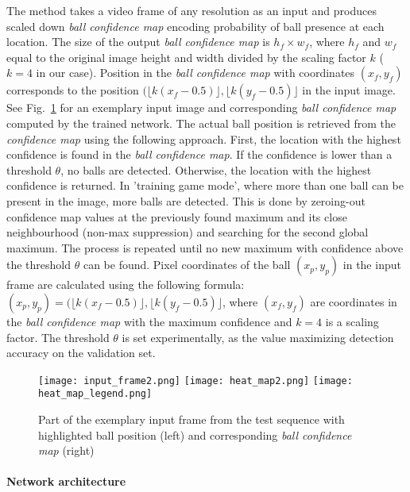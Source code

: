 \documentclass[a4paper,twoside]{article}
\begin{document}
The method takes a video frame of any resolution as an input and produces scaled down \emph{ball confidence map} encoding probability of ball presence at each location.
The size of the output \emph{ball confidence map} is  $h_f \times w_f$, where $h_f$ and $w_f$ equal to the original image height and width divided by the scaling  factor $k$ ($k=4$ in our case).
Position in the \emph{ball confidence map} with coordinates $(x_f, y_f)$ corresponds to the position 
$(\lfloor k(x_f-0.5) \rfloor, \lfloor k(y_f-0.5) \rfloor$ in the input image.
See Fig.~\ref{jk:fig:input_output} for an exemplary input image and corresponding \emph{ball confidence map} computed by the trained network.
The actual ball position is retrieved from the \emph{confidence map} using the following approach. 
First, the location with the highest confidence is found in the \emph{ball confidence map}.
If the confidence is lower than a threshold $\theta$, no balls are detected.
Otherwise, the location with the highest confidence is returned.
In 'training game mode', where more than one ball can be present in the image, more balls are detected. 
This is done by zeroing-out confidence map values at the previously found maximum and its close neighbourhood  (non-max suppression) and searching for the second global maximum.
The process is repeated until no new maximum with confidence above the threshold $\theta$ can be found.
Pixel coordinates of the ball $(x_p, y_p)$ in the input frame are calculated using the following formula:
$(x_p, y_p) = (\lfloor k(x_f-0.5) \rfloor, \lfloor k(y_f-0.5) \rfloor$, 
where $(x_f, y_f)$ are coordinates in the \emph{ball confidence map} with the maximum confidence and $k=4$ is a scaling factor.
The threshold $\theta$ is set experimentally, as the value maximizing detection accuracy on the validation set.

\begin{figure}
\texttt{[image: input\_frame2.png]}
  \texttt{[image: heat\_map2.png]}
  \texttt{[image: heat\_map\_legend.png]}
  \caption{Part of the exemplary input frame from the test sequence with highlighted ball position (left) and corresponding \emph{ball confidence map} (right)}
\label{jk:fig:input_output}
\end{figure}

\paragraph{Network architecture}
\end{document}
